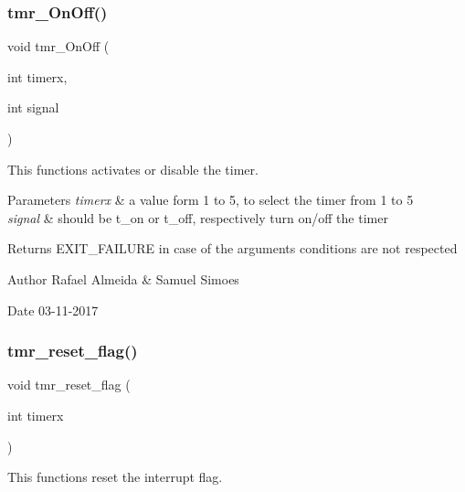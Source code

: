 \subsubsection{tmr\+\_\+\+On\+Off()}
{\footnotesize\ttfamily void tmr\+\_\+\+On\+Off (\begin{DoxyParamCaption}\item[{int}]{timerx,  }\item[{int}]{signal }\end{DoxyParamCaption})}



This functions activates or disable the timer. 


\begin{DoxyParams}{Parameters}
{\em timerx} & a value form 1 to 5, to select the timer from 1 to 5 \\
\hline
{\em signal} & should be t\+\_\+on or t\+\_\+off, respectively turn on/off the timer \\
\hline
\end{DoxyParams}
\begin{DoxyReturn}{Returns}
E\+X\+I\+T\+\_\+\+F\+A\+I\+L\+U\+RE in case of the argument\textquotesingle{}s conditions are not respected 
\end{DoxyReturn}
\begin{DoxyAuthor}{Author}
Rafael Almeida \& Samuel Simoes 
\end{DoxyAuthor}
\begin{DoxyDate}{Date}
03-\/11-\/2017 
\end{DoxyDate}
\mbox{\label{timer__libs_8c_aba8fbc7ba2284c6aa129f79864535e69}} 
\subsubsection{tmr\+\_\+reset\+\_\+flag()}
{\footnotesize\ttfamily void tmr\+\_\+reset\+\_\+flag (\begin{DoxyParamCaption}\item[{int}]{timerx }\end{DoxyParamCaption})}



This functions reset the interrupt flag. 


